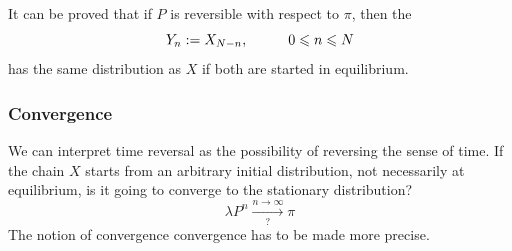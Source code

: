 \documentclass{article}
\begin{document}
It can be proved that if $P$ is reversible with respect to $\pi$, then the 
        \begin{equation*}
            Y_n := X_{N-n}, \hspace{1 cm} 0 \leqslant n \leqslant N
        \end{equation*}
        has the same distribution as $X$ if both are started in equilibrium.
\subsubsection{Convergence}
We can interpret time reversal as the possibility of reversing the sense of time. If the chain $X$ starts from an arbitrary initial distribution, not necessarily at equilibrium, is it going to converge to the stationary distribution?
\begin{equation*}
    \lambda P^n \xrightarrow[\text{?}]{n \rightarrow \infty} \pi
\end{equation*}
The notion of convergence convergence has to be made more precise.
\end{document}
